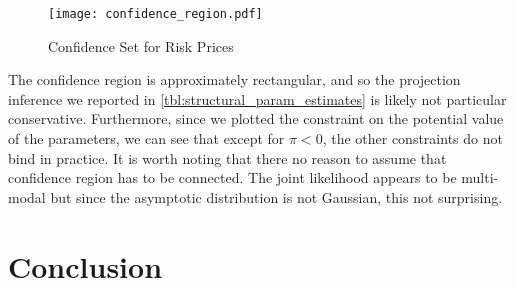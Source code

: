 \documentclass[11pt, letterpaper, twoside, final]{article}
\begin{document}
\begin{figure}[htb]

    \centering
    \caption{Confidence Set for Risk Prices}
    \label{fig:confidence_region}

    \texttt{[image: confidence\_region.pdf]}
\end{figure}

The confidence region is approximately rectangular, and so the projection inference we reported in \cref{tbl:structural_param_estimates} is likely not particular conservative. Furthermore, since we plotted the constraint on the potential value of the parameters, we can see that except for $\pi < 0$, the other constraints do not bind in practice. It is worth noting that there no reason to assume that confidence region has to be connected. The joint likelihood appears to be multi-modal but since the asymptotic distribution is not Gaussian, this not surprising.


\section{Conclusion}

\clearpage


{}
\printbibliography
\clearpage
\end{document}

